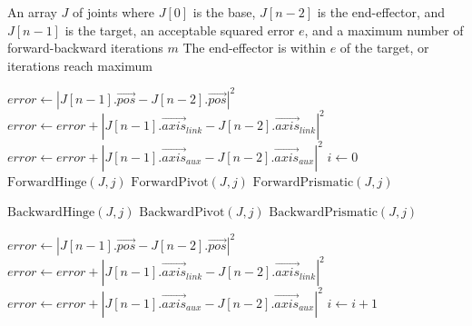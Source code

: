 \begin{algorithm}
\caption{FABRIK Algorithm}
\label{alg:fabrik}
\footnotesize{
\begin{algorithmic}[1]
    \Require An array $J$ of joints where $J[0]$ is the base, $J[n-2]$ is the end-effector, and $J[n-1]$ is the target, an acceptable squared error $e$, and a maximum number of forward-backward iterations $m$
    \Ensure The end-effector is within $e$ of the target, or iterations reach maximum
    
        \State $error\gets |J[n-1].\vec{pos}-J[n-2].\vec{pos}|^2$
        \State $error\gets error+|J[n-1].\vec{axis}_{link}-J[n-2].\vec{axis}_{link}|^2$
        \State $error\gets error+|J[n-1].\vec{axis}_{aux}-J[n-2].\vec{axis}_{aux}|^2$
        \State $i\gets 0$
                    \State $\text{ForwardHinge}(J, j)$
                    \State $\text{ForwardPivot}(J, j)$
                    \State $\text{ForwardPrismatic}(J, j)$
                \EndIf
            \EndFor
            \Statex

                    \State $\text{BackwardHinge}(J, j)$
                    \State $\text{BackwardPivot}(J, j)$
                    \State $\text{BackwardPrismatic}(J, j)$
                \EndIf
            \EndFor
            \Statex

            \State $error\gets |J[n-1].\vec{pos}-J[n-2].\vec{pos}|^2$
            \State $error\gets error+|J[n-1].\vec{axis}_{link}-J[n-2].\vec{axis}_{link}|^2$
            \State $error\gets error+|J[n-1].\vec{axis}_{aux}-J[n-2].\vec{axis}_{aux}|^2$
            \State $i\gets i+1$
        \EndWhile
    \EndFunction
\end{algorithmic}
}
\end{algorithm}
